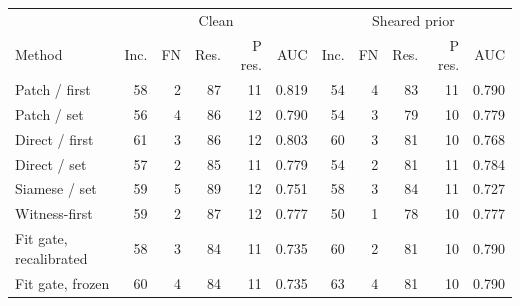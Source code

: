 \begin{tabular}{lrrrrrrrrrr}
\toprule
 & \multicolumn{5}{c}{Clean} & \multicolumn{5}{c}{Sheared prior} \\
Method & Inc. & FN & Res. & P res. & AUC & Inc. & FN & Res. & P res. & AUC \\
\midrule
Patch / first & 58 & 2 & 87 & 11 & 0.819 & 54 & 4 & 83 & 11 & 0.790 \\
Patch / set & 56 & 4 & 86 & 12 & 0.790 & 54 & 3 & 79 & 10 & 0.779 \\
Direct / first & 61 & 3 & 86 & 12 & 0.803 & 60 & 3 & 81 & 10 & 0.768 \\
Direct / set & 57 & 2 & 85 & 11 & 0.779 & 54 & 2 & 81 & 11 & 0.784 \\
Siamese / set & 59 & 5 & 89 & 12 & 0.751 & 58 & 3 & 84 & 11 & 0.727 \\
Witness-first & 59 & 2 & 87 & 12 & 0.777 & 50 & 1 & 78 & 10 & 0.777 \\
Fit gate, recalibrated & 58 & 3 & 84 & 11 & 0.735 & 60 & 2 & 81 & 10 & 0.790 \\
Fit gate, frozen & 60 & 4 & 84 & 11 & 0.735 & 63 & 4 & 81 & 10 & 0.790 \\
\bottomrule
\end{tabular}
